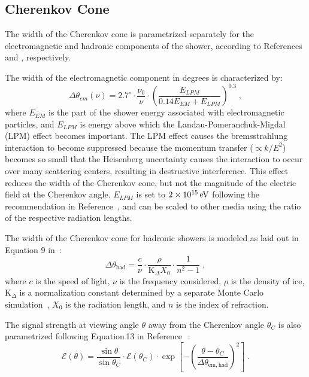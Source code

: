 
\subsection{Cherenkov Cone}
\label{subsec:cherenkov_width}
The width of the Cherenkov cone is parametrized separately for the electromagnetic and hadronic components of the shower, according to References \cite{JaimeAskarian2000} and \cite{jaime05}, respectively.

The width of the electromagnetic
component in degrees is characterized by:
\begin{equation}
\label{eq:deltheta_em}
\Delta\theta_{em}(\nu)=2.7^{\circ} \cdot \frac{\nu_0}{\nu}\cdot \left(
  \frac{E_{LPM}}{ 0.14 E_{EM}+E_{LPM}} \right)^{0.3} \;,
\end{equation}
where 
$E_{EM}$ is the part of the shower energy associated with electromagnetic particles, and 
$E_{LPM}$ is energy above which the Landau-Pomeranchuk-Migdal
(LPM) effect becomes important.  
The LPM effect causes
the bremsstrahlung interaction to become suppressed because
the momentum transfer ($\propto k/E^2$) becomes so small 
that the Heisenberg uncertainty
causes the interaction to occur over many
scattering centers, resulting in destructive interference.  
This effect reduces the width of the Cherenkov cone, but not the magnitude of the electric field at the Cherenkov angle.
$E_{LPM}$ is set to $2\times10^{15}\mathrm{\,e\kern -0.1em V}$ following the recommendation in Reference~\cite{JaimeAskarian2000}, and can be scaled to other media using the ratio of the respective radiation lengths.


The width of the Cherenkov cone for hadronic showers is modeled as laid out in Equation 9
in~\cite{jaime05}:
\begin{equation}
\Delta \theta_{\mathrm{had}}=\frac{c}{\nu} \cdot
	\frac{\rho}{\mathrm{K}_{\Delta} X_0} \cdot
	\frac{1}{n^2-1} \;,
\end{equation}
\noindent where
$c$ is the speed of light,
$\nu$ is the frequency considered, 
$\rho$ is the density of ice,
$\mathrm{K}_{\Delta}$ is a normalization constant determined by a
separate Monte Carlo simulation~\cite{jaime05},
$X_0$ is the radiation length, and
$n$ is the index of refraction.

The signal strength at viewing angle $\theta$ 
away from the Cherenkov angle $\theta_C$ is also parametrized following
Equation\,13 in Reference\,~\cite{jaime05}:
\begin{equation}
\mathcal{E}(\theta)=\frac{\sin{\theta}}{\sin{\theta_C}} \cdot
\mathcal{E}(\theta_C)\cdot \exp\left[-\left(
    \frac{\theta-\theta_C}{\Delta\theta_{\mathrm{em,had}}} \right)^2
\right] \;.
\end{equation}





